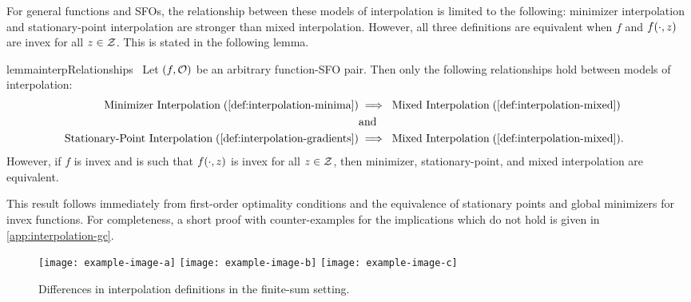 For general functions and \acp{SFO}, the relationship between these models of interpolation is limited to the following: minimizer interpolation and stationary-point interpolation are stronger than mixed interpolation. 
However, all three definitions are equivalent when \( f \) and \( f(\cdot, \z) \) are invex for all \( z \in \calZ \).
This is stated in the following lemma.
\begin{restatable}{lemma}{interpRelationships}~\label{thm:interp-relationships}
    Let \( \rbr{f, \oracle{}} \) be an arbitrary function-\ac{SFO} pair. 
    Then only the following relationships hold between models of interpolation:
    \begin{align*}
        \text{Minimizer Interpolation} \; (\autoref{def:interpolation-minima}) &\implies \; \text{Mixed Interpolation} \; (\autoref{def:interpolation-mixed})\\
                                                                               & \text{and} &\\
        \text{Stationary-Point Interpolation} \; (\autoref{def:interpolation-gradients}) &\implies \; \text{Mixed Interpolation} \; (\autoref{def:interpolation-mixed}).
    \end{align*}
    However, if \( f \) is invex and \oracle{} is such that \( f(\cdot, \z) \) is invex for all \( \z \in \calZ \), then minimizer, stationary-point, and mixed interpolation are equivalent.
\end{restatable}
\noindent This result follows immediately from first-order optimality conditions and the equivalence of stationary points and global minimizers for invex functions.
For completeness, a short proof with counter-examples for the implications which do not hold is given in \autoref{app:interpolation-gc}.


\begin{figure}[]
    \centering
    \texttt{[image: example-image-a]}
    \texttt{[image: example-image-b]}
    \texttt{[image: example-image-c]}
    \caption{Differences in interpolation definitions in the finite-sum setting.}%
    \label{fig:interpolation-types}
\end{figure}

